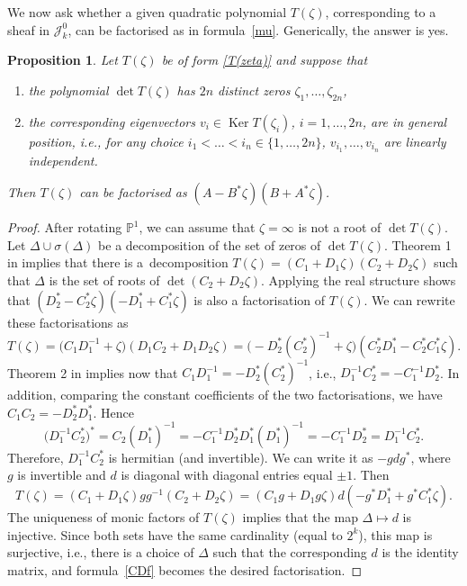 \documentclass[pdftex]{sigma}
\newcommand{\Ker}{\operatorname{Ker}}
\numberwithin{equation}{section}
\newtheorem{Proposition}[Theorem]{Proposition}
 { \theoremstyle{definition}
\newtheorem{Definition}[Theorem]{Definition}
\newtheorem{Note}[Theorem]{Note}
\newtheorem{Example}[Theorem]{Example}
\newtheorem{Remark}[Theorem]{Remark} }
\newcommand{\oP}{{\mathbb{P}}}
\begin{document}
We now ask whether a given quadratic polynomial $T(\zeta)$, corresponding to a sheaf in $\mathscr{J}_k^0$,
can be factorised as in formula~\eqref{mu}. Generically, the answer is yes.

\begin{Proposition} Let $T(\zeta)$ be of form \eqref{T(zeta)} and suppose that
\begin{enumerate}\itemsep=0pt
\item[$(i)$] the polynomial $\det T(\zeta)$ has $2n$ distinct zeros $\zeta_1,\dots,\zeta_{2n}$,
\item[$(ii)$] the corresponding eigenvectors $v_i\in \Ker T(\zeta_{i})$, $i=1,\dots,2n$, are in general position, i.e., for any choice $i_1<\dots<i_n\in \{1,\dots,2n\}$, $v_{i_1},\dots,v_{i_n}$ are linearly independent.
\end{enumerate}
Then $T(\zeta)$ can be factorised as $(A-B^\ast\zeta)(B+A^\ast\zeta)$.\label{distinct}
\end{Proposition}

\begin{proof}
After rotating $\oP^1$, we can assume that $\zeta=\infty$ is not a root of $\det T(\zeta)$. Let $\Delta\cup \sigma(\Delta)$ be a decomposition of the set of zeros of $\det T(\zeta)$. Theorem 1 in \cite{Mal} implies that there is a~decomposition $T(\zeta)=(C_1+D_1\zeta)(C_2+D_2\zeta)$ such that $\Delta$ is the set of roots of $\det(C_2+D_2\zeta)$. Applying the real structure shows that $(D_2^\ast-C_2^\ast\zeta)(-D_1^\ast+C_1^\ast\zeta)$ is also a factorisation of $T(\zeta)$.
We can rewrite these factorisations as
\[
T(\zeta)=\big(C_1D_1^{-1}+\zeta\big)(D_1C_2+D_1D_2\zeta)=\bigl(-D_2^\ast(C_2^\ast)^{-1}+\zeta\big)(C_2^\ast D_1^\ast-C_2^\ast C_1^\ast\zeta).
\]
Theorem 2 in \cite{Mal} implies now that $C_1D_1^{-1}=-D_2^\ast(C_2^\ast)^{-1}$, i.e., $D_1^{-1}C_2^\ast=-C_1^{-1}D_2^\ast$. In addition, comparing the constant coefficients of the two factorisations, we have $C_1C_2=-D_2^\ast D_1^\ast$. Hence
\[
\big(D_1^{-1}C_2^\ast\big)^\ast=C_2(D_1^\ast)^{-1}=-C_1^{-1}D_2^\ast D_1^\ast(D_1^\ast)^{-1}= -C_1^{-1}D_2^\ast=D_1^{-1}C_2^\ast.
\]
Therefore, $D_1^{-1}C_2^\ast$ is hermitian (and invertible). We can write it as $-gdg^\ast$, where $g$ is invertible and $d$ is diagonal with diagonal entries equal $\pm 1$.
Then
\begin{equation} T(\zeta)=(C_1+D_1\zeta)gg^{-1}(C_2+D_2\zeta)=(C_1g+D_1g\zeta)d(-g^\ast D_1^\ast+g^\ast C_1^\ast\zeta).
\label{CDf}\end{equation}
The uniqueness of monic factors of $T(\zeta)$ implies that the map $\Delta\mapsto d$ is injective. Since both sets have the same cardinality (equal to $2^k$), this map is surjective, i.e., there is a choice of $\Delta$ such that the corresponding $d$ is the identity matrix, and formula~\eqref{CDf} becomes the desired factorisation.
\end{proof}
\end{document}
